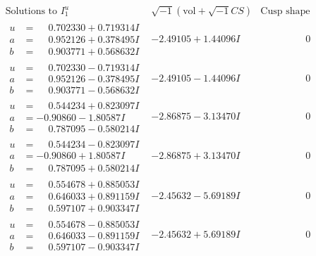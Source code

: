 \documentclass[1p]{elsarticle_modified}
\theoremstyle{definition}
\newcommand{\I}{\sqrt{-1}}
\begin{document}
$$\begin{array}{c|c|c}  
\text{Solutions to }I^u_{1}& \I (\text{vol} + \sqrt{-1}CS) & \text{Cusp shape}\\
 \hline 
\begin{aligned}
u &= \phantom{-}0.702330 + 0.719314 I \\
a &= \phantom{-}0.952126 + 0.378495 I \\
b &= \phantom{-}0.903771 + 0.568632 I\end{aligned}
 & -2.49105 + 1.44096 I & \phantom{-0.000000 } 0 \\ \hline\begin{aligned}
u &= \phantom{-}0.702330 - 0.719314 I \\
a &= \phantom{-}0.952126 - 0.378495 I \\
b &= \phantom{-}0.903771 - 0.568632 I\end{aligned}
 & -2.49105 - 1.44096 I & \phantom{-0.000000 } 0 \\ \hline\begin{aligned}
u &= \phantom{-}0.544234 + 0.823097 I \\
a &= -0.90860 - 1.80587 I \\
b &= \phantom{-}0.787095 - 0.580214 I\end{aligned}
 & -2.86875 - 3.13470 I & \phantom{-0.000000 } 0 \\ \hline\begin{aligned}
u &= \phantom{-}0.544234 - 0.823097 I \\
a &= -0.90860 + 1.80587 I \\
b &= \phantom{-}0.787095 + 0.580214 I\end{aligned}
 & -2.86875 + 3.13470 I & \phantom{-0.000000 } 0 \\ \hline\begin{aligned}
u &= \phantom{-}0.554678 + 0.885053 I \\
a &= \phantom{-}0.646033 + 0.891159 I \\
b &= \phantom{-}0.597107 + 0.903347 I\end{aligned}
 & -2.45632 - 5.69189 I & \phantom{-0.000000 } 0 \\ \hline\begin{aligned}
u &= \phantom{-}0.554678 - 0.885053 I \\
a &= \phantom{-}0.646033 - 0.891159 I \\
b &= \phantom{-}0.597107 - 0.903347 I\end{aligned}
 & -2.45632 + 5.69189 I & \phantom{-0.000000 } 0 \\ \hline\begin{aligned}

\end{aligned}
\end{array}$$
\end{document}
